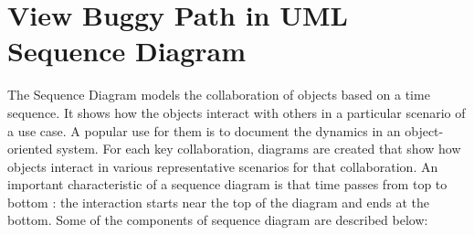 \section{View Buggy Path in UML Sequence Diagram}

The Sequence Diagram models the collaboration of objects based on a time sequence. It shows how the objects interact with others in a particular scenario of a use case. A popular use for them is to document the dynamics in an object-oriented system.  For each key collaboration, diagrams are created that show how objects interact in various representative scenarios for that collaboration. An important characteristic of a sequence diagram is that time passes from top to bottom : the interaction starts near the top of the diagram and ends at the bottom. Some of the components of sequence diagram \cite{ref_107_visual-paradigm:visual-paradigm} are described below:

